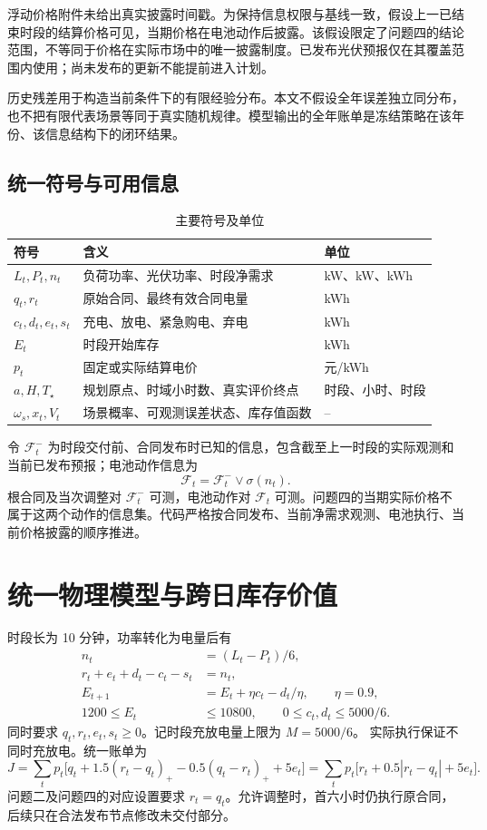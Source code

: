 \documentclass[UTF8,a4paper,zihao=-4,fontset=mac]{ctexart}
\newcommand{\pos}[1]{\left(#1\right)_+}
\begin{document}
浮动价格附件未给出真实披露时间戳。为保持信息权限与基线一致，假设上一已结束时段的结算价格可见，当期价格在电池动作后披露。该假设限定了问题四的结论范围，不等同于价格在实际市场中的唯一披露制度。已发布光伏预报仅在其覆盖范围内使用；尚未发布的更新不能提前进入计划。

历史残差用于构造当前条件下的有限经验分布。本文不假设全年误差独立同分布，也不把有限代表场景等同于真实随机规律。模型输出的全年账单是冻结策略在该年份、该信息结构下的闭环结果。

\subsection{统一符号与可用信息}
\begin{table}[H]\centering\caption{主要符号及单位}
\begin{tabular}{lll}\toprule
符号&含义&单位\\\midrule
\(L_t,P_t,n_t\)&负荷功率、光伏功率、时段净需求&kW、kW、kWh\\
\(q_t,r_t\)&原始合同、最终有效合同电量&kWh\\
\(c_t,d_t,e_t,s_t\)&充电、放电、紧急购电、弃电&kWh\\
\(E_t\)&时段开始库存&kWh\\
\(p_t\)&固定或实际结算电价&元/kWh\\
\(a,H,T_\star\)&规划原点、时域小时数、真实评价终点&时段、小时、时段\\
\(\omega_s,x_t,V_t\)&场景概率、可观测误差状态、库存值函数&--\\
\bottomrule\end{tabular}
\end{table}

令 \(\mathcal F_t^-\) 为时段交付前、合同发布时已知的信息，包含截至上一时段的实际观测和当前已发布预报；电池动作信息为
\begin{equation}
\mathcal F_t=\mathcal F_t^-\vee\sigma(n_t).
\end{equation}
根合同及当次调整对 \(\mathcal F_t^-\) 可测，电池动作对 \(\mathcal F_t\) 可测。问题四的当期实际价格不属于这两个动作的信息集。代码严格按合同发布、当前净需求观测、电池执行、当前价格披露的顺序推进。

\section{统一物理模型与跨日库存价值}
时段长为 10 分钟，功率转化为电量后有
\begin{align}
n_t&=(L_t-P_t)/6,\\
r_t+e_t+d_t-c_t-s_t&=n_t,\\
E_{t+1}&=E_t+\eta c_t-d_t/\eta,\qquad \eta=0.9,\\
1200\le E_t&\le10800,\qquad 0\le c_t,d_t\le 5000/6.
\end{align}
同时要求 \(q_t,r_t,e_t,s_t\ge0\)。记时段充放电量上限为 \(M=5000/6\)。
实际执行保证不同时充放电。统一账单为
\begin{equation}\label{eq:bill}
J=\sum_t p_t\bigl[q_t+1.5\pos{r_t-q_t}-0.5\pos{q_t-r_t}+5e_t\bigr]
=\sum_t p_t\bigl[r_t+0.5|r_t-q_t|+5e_t\bigr].
\end{equation}
问题二及问题四的对应设置要求 \(r_t=q_t\)。允许调整时，首六小时仍执行原合同，后续只在合法发布节点修改未交付部分。
\end{document}
